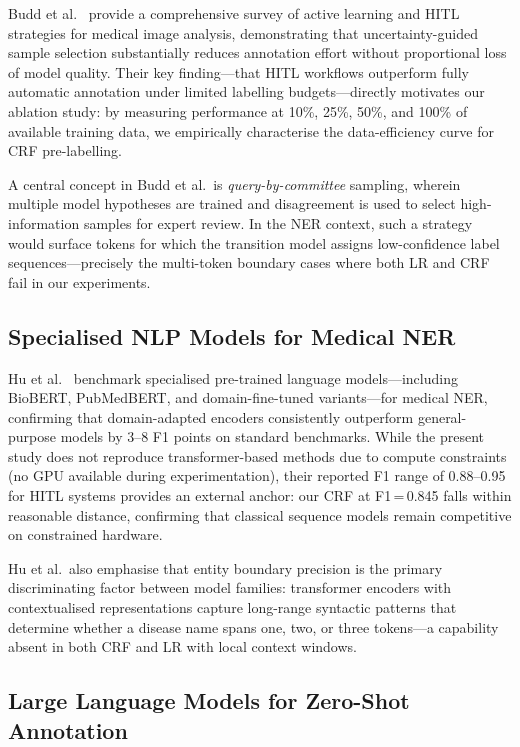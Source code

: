\documentclass[sigconf,nonacm]{acmart}
\begin{document}
Budd et al.~\cite{budd2021} provide a comprehensive survey of active learning and HITL strategies for medical image analysis, demonstrating that uncertainty-guided sample selection substantially reduces annotation effort without proportional loss of model quality. Their key finding---that HITL workflows outperform fully automatic annotation under limited labelling budgets---directly motivates our ablation study: by measuring performance at 10\%, 25\%, 50\%, and 100\% of available training data, we empirically characterise the data-efficiency curve for CRF pre-labelling.

A central concept in Budd et al.\ is \emph{query-by-committee} sampling, wherein multiple model hypotheses are trained and disagreement is used to select high-information samples for expert review. In the NER context, such a strategy would surface tokens for which the transition model assigns low-confidence label sequences---precisely the multi-token boundary cases where both LR and CRF fail in our experiments.

\subsection{Specialised NLP Models for Medical NER}

Hu et al.~\cite{hu2024} benchmark specialised pre-trained language models---including BioBERT, PubMedBERT, and domain-fine-tuned variants---for medical NER, confirming that domain-adapted encoders consistently outperform general-purpose models by 3--8 F1 points on standard benchmarks. While the present study does not reproduce transformer-based methods due to compute constraints (no GPU available during experimentation), their reported F1 range of 0.88--0.95 for HITL systems provides an external anchor: our CRF at F1\,=\,0.845 falls within reasonable distance, confirming that classical sequence models remain competitive on constrained hardware.

Hu et al.\ also emphasise that entity boundary precision is the primary discriminating factor between model families: transformer encoders with contextualised representations capture long-range syntactic patterns that determine whether a disease name spans one, two, or three tokens---a capability absent in both CRF and LR with local context windows.

\subsection{Large Language Models for Zero-Shot Annotation}
\end{document}
